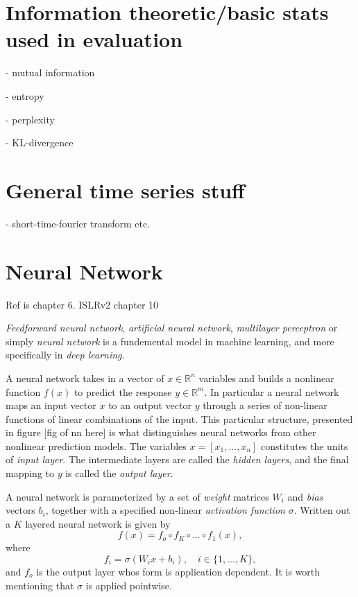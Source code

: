 \documentclass[../../thesis.tex]{subfiles}
\begin{document}


\section{Information theoretic/basic stats used in evaluation}

- mutual information

- entropy

- perplexity

- KL-divergence

\section{General time series stuff}
- short-time-fourier transform etc.

\section{Neural Network}

Ref is \cite{deeplearningbook} chapter 6. ISLRv2 chapter 10

\textit{Feedforward neural network}, \textit{artificial neural network}, \textit{multilayer perceptron} or simply \textit{neural network} is a fundemental model in machine learning, and more specifically in \textit{deep learning}. 

A neural network takes in a vector of $x \in \mathbb{R}^n$ variables and builds a nonlinear function $f(x)$ to predict the response $y\in \mathbb{R}^m$. In particular a neural network maps an input vector $x$ to an output vector $y$ through a series of non-linear functions of linear combinations of the input. This particular structure, presented in figure [fig of nn here] is what distinguishes neural networks from other nonlinear prediction models. The variables $x = [x_1,...,x_n]$ constitutes the units of \textit{input layer}. The intermediate layers are called the \textit{hidden layers}, and the final mapping to $y$ is called the \textit{output layer}.

A neural network is parameterized by a set of \textit{weight} matrices $W_i$ and \textit{bias} vectors $b_i$, together with a specified non-linear \textit{activation function} $\sigma$. Written out a $K$ layered neural network is given by 
\[ 
f(x) = f_o \circ f_K \circ \ldots \circ f_1(x),
\]
where 
$$f_i = \sigma(W_ix+b_i), \quad i \in \{1,...,K\},$$ 
and $f_o$ is the output layer whos form is application dependent. It is worth mentioning that $\sigma$ is applied pointwise.
\end{document}
